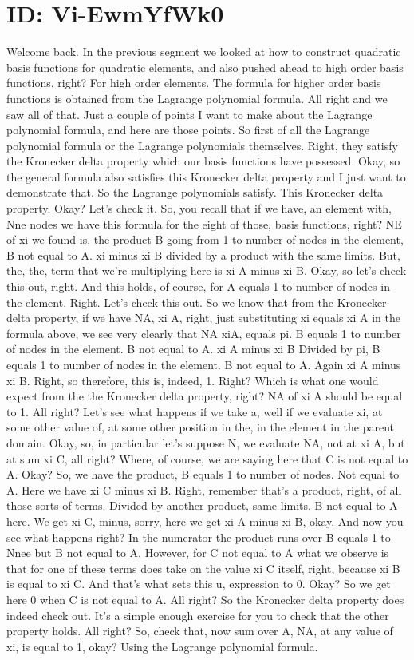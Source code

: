 \documentclass[10pt]{article}
\begin{document}
\section*{ID: Vi-EwmYfWk0}
Welcome back. In the previous segment we looked at how to construct quadratic basis functions for quadratic elements, and also pushed ahead to high order basis functions, right? For high order elements. The formula for higher order basis functions is obtained from the Lagrange polynomial formula. All right and we saw all of that. Just a couple of points I want to make about the Lagrange polynomial formula, and here are those points. So first of all the Lagrange polynomial formula or the Lagrange polynomials themselves. Right, they satisfy the Kronecker delta property which our basis functions have possessed. Okay, so the general formula also satisfies this Kronecker delta property and I just want to demonstrate that. So the Lagrange polynomials satisfy. This Kronecker delta property. Okay? Let's check it. So, you recall that if we have, an element with, Nne nodes we have this formula for the eight of those, basis functions, right? NE of xi we found is, the product B going from 1 to number of nodes in the element, B not equal to A. xi minus xi B divided by a product with the same limits. But, the, the, term that we're multiplying here is xi A minus xi B. Okay, so let's check this out, right. And this holds, of course, for A equals 1 to number of nodes in the element. Right. Let's check this out. So we know that from the Kronecker delta property, if we have NA, xi A, right, just substituting xi equals xi A in the formula above, we see very clearly that NA xiA, equals pi. B equals 1 to number of nodes in the element. B not equal to A. xi A minus xi B Divided by pi, B equals 1 to number of nodes in the element. B not equal to A. Again xi A minus xi B. Right, so therefore, this is, indeed, 1. Right? Which is what one would expect from the the Kronecker delta property, right? NA of xi A should be equal to 1. All right? Let's see what happens if we take a, well if we evaluate xi, at some other value of, at some other position in the, in the element in the parent domain. Okay, so, in particular let's suppose N, we evaluate NA, not at xi A, but at sum xi C, all right? Where, of course, we are saying here that C is not equal to A. Okay? So, we have the product, B equals 1 to number of nodes. Not equal to A. Here we have xi C minus xi B. Right, remember that's a product, right, of all those sorts of terms. Divided by another product, same limits. B not equal to A here. We get xi C, minus, sorry, here we get xi A minus xi B, okay. And now you see what happens right? In the numerator the product runs over B equals 1 to Nnee but B not equal to A. However, for C not equal to A what we observe is that for one of these terms does take on the value xi C itself, right, because xi B is equal to xi C. And that's what sets this u, expression to 0. Okay? So we get here 0 when C is not equal to A. All right? So the Kronecker delta property does indeed check out. It's a simple enough exercise for you to check that the other property holds. All right? So, check that, now sum over A, NA, at any value of xi, is equal to 1, okay? Using the Lagrange polynomial formula. 
\end{document}
